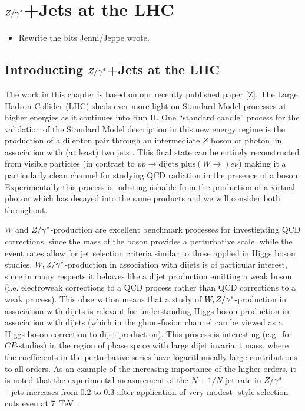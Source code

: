 \chapter{$Z/\gamma^*$+Jets at the LHC}
\label{chap:Zs}

{\color{red}
\begin{itemize}
	\item Rewrite the bits Jenni/Jeppe wrote.
\end{itemize}
}

\section{Introducting $Z/\gamma^*$+Jets at the LHC}

		The work in this chapter is based on our recently published paper [Z].
		The Large Hadron Collider (LHC)
		sheds ever more light on Standard Model processes at higher energies as it
		continues into Run II.  One ``standard candle'' process for the validation of
		the Standard Model description in this new energy regime is the production of
		a dilepton pair through an intermediate $Z$ boson or photon, in
		association with (at least) two jets \cite{Chatrchyan:2011ne, Aad:2011qv,
		Chatrchyan:2013tna, Aad:2013ysa, Khachatryan:2014zya, Aad:2014rta,
		Khachatryan:2014dea}.  This final state can be entirely reconstructed from
		visible particles (in contrast to $pp\to \text{dijets plus}(W\to) e\nu$) making it a particularly
		clean channel for studying QCD radiation in the presence of a boson.
		Experimentally this process is indistinguishable from the production of a
		virtual photon which has decayed into the same products and we will consider
		both throughout.

		$W$ and $Z/\gamma^*$-production are excellent benchmark processes for investigating
		QCD corrections, since the mass of the boson provides a perturbative scale,
		while the event rates allow for jet selection criteria similar to those
		applied in Higgs boson studies. $W,Z/\gamma^*$-production in association with dijets
		is of particular interest, since in many respects it behaves like a dijet
		production emitting a weak boson (i.e. electroweak corrections to a QCD
		process rather than QCD corrections to a weak process). This observation
		means that a study of $W,Z/\gamma^*$-production in association with dijets is
		relevant for understanding Higgs-boson production in association with dijets
		(which in the gluon-fusion channel can be viewed as a Higgs-boson correction
		to dijet production). This process is interesting (e.g.~for $CP$-studies) in
		the region of phase space with large dijet invariant mass, where the
		coefficients in the perturbative series have logarithmically large
		contributions to all orders. As an example of the increasing importance of
		the higher orders, it is noted that the experimental measurement of the
		$N+1/N$-jet rate in $Z/\gamma^*$+jets increases from 0.2 to 0.3 after application of
		very modest \wbf-style selection cuts even at 7~TeV~\cite{Chatrchyan:2011ne,Aad:2011qv,Aad:2013ysa}.


